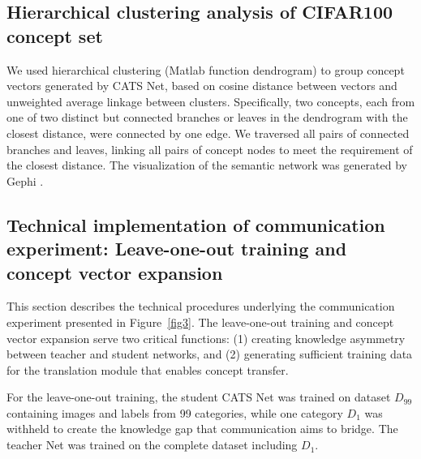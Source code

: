 \documentclass[pdflatex,sn-mathphys-num,lineno]{sn-jnl}%
\begin{document}
\begin{CJK}{UTF8}{gbsn}
\subsection{Hierarchical clustering analysis of CIFAR100 concept set}
We used hierarchical clustering  (Matlab function dendrogram) to group concept vectors generated by CATS Net, based on cosine distance between vectors and unweighted average linkage between clusters. Specifically, two concepts, each from one of two distinct but connected branches or leaves in the dendrogram with the closest distance, were connected by one edge. We traversed all pairs of connected branches and leaves, linking all pairs of concept nodes to meet the requirement of the closest distance. The visualization of the semantic network was generated by Gephi \cite{bastian_gephi_2009}.

\subsection{Technical implementation of communication experiment: Leave-one-out training and concept vector expansion}
This section describes the technical procedures underlying the communication experiment presented in Figure~\ref{fig3}. The leave-one-out training and concept vector expansion serve two critical functions: (1) creating knowledge asymmetry between teacher and student networks, and (2) generating sufficient training data for the translation module that enables concept transfer.

For the leave-one-out training, the student CATS Net was trained on dataset $D_{99}$ containing images and labels from 99 categories, while one category $D_1$ was withheld to create the knowledge gap that communication aims to bridge. The teacher Net was trained on the complete dataset including $D_1$. 


\end{CJK}
\end{document}
